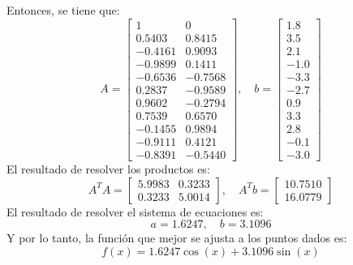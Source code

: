 \documentclass{article}
\begin{document}
Entonces, se tiene que:
\begin{equation}
    A = \begin{bmatrix}
        1 & 0 \\
        0.5403 & 0.8415 \\
        -0.4161 & 0.9093 \\
        -0.9899 & 0.1411 \\
        -0.6536 & -0.7568 \\
        0.2837 & -0.9589 \\
        0.9602 & -0.2794 \\
        0.7539 & 0.6570 \\
        -0.1455 & 0.9894 \\
        -0.9111 & 0.4121 \\
        -0.8391 & -0.5440
    \end{bmatrix}, \quad b = \begin{bmatrix}
        1.8 \\
        3.5 \\
        2.1 \\
        -1.0 \\
        -3.3 \\
        -2.7 \\
        0.9 \\
        3.3 \\
        2.8 \\
        -0.1 \\
        -3.0
    \end{bmatrix}
\end{equation}
El resultado de resolver los productos es:
\begin{equation}
    A^TA = \begin{bmatrix}
        5.9983 & 0.3233 \\
        0.3233 & 5.0014
    \end{bmatrix}, \quad A^Tb = \begin{bmatrix}
        10.7510 \\
        16.0779
    \end{bmatrix}
\end{equation}
El resultado de resolver el sistema de ecuaciones es:
\begin{equation}
    a = 1.6247, \quad b = 3.1096
\end{equation}
Y por lo tanto, la función que mejor se ajusta a los puntos dados es:
\begin{equation}
    f(x) = 1.6247 \cos(x) + 3.1096 \sin(x)
\end{equation}
\end{document}
